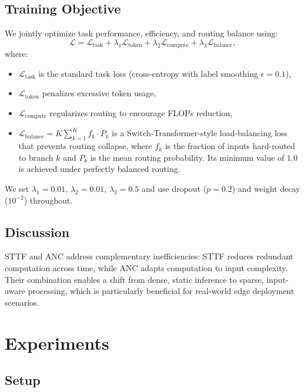 \documentclass{article}
\begin{document}
\subsection{Training Objective}

We jointly optimize task performance, efficiency, and routing balance using:
\begin{equation}
\mathcal{L} = \mathcal{L}_{\text{task}} + \lambda_1 \mathcal{L}_{\text{token}} + \lambda_2 \mathcal{L}_{\text{compute}} + \lambda_3 \mathcal{L}_{\text{balance}},
\end{equation}
where:
\begin{itemize}
    \item $\mathcal{L}_{\text{task}}$ is the standard task loss (cross-entropy with label smoothing $\epsilon=0.1$),
    \item $\mathcal{L}_{\text{token}}$ penalizes excessive token usage,
    \item $\mathcal{L}_{\text{compute}}$ regularizes routing to encourage FLOPs reduction,
    \item $\mathcal{L}_{\text{balance}} = K \sum_{k=1}^{K} f_k \cdot P_k$ is a Switch-Transformer-style load-balancing loss~\cite{fedus2022switch} that prevents routing collapse, where $f_k$ is the fraction of inputs hard-routed to branch $k$ and $P_k$ is the mean routing probability. Its minimum value of $1.0$ is achieved under perfectly balanced routing.
\end{itemize}
We set $\lambda_1 = 0.01$, $\lambda_2 = 0.01$, $\lambda_3 = 0.5$ and use dropout ($p=0.2$) and weight decay ($10^{-2}$) throughout.

\subsection{Discussion}

STTF and ANC address complementary inefficiencies: STTF reduces redundant computation across time, while ANC adapts computation to input complexity. Their combination enables a shift from dense, static inference to sparse, input-aware processing, which is particularly beneficial for real-world edge deployment scenarios.

\section{Experiments}

\subsection{Setup}
\end{document}
